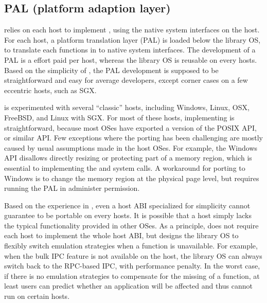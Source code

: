 \subsection{PAL (platform adaption layer)}
\label{sec:overview:host:pal}


\graphene{} relies on each host to implement \thehostabi{}, using the native system interfaces on the host.
For each host, a platform translation layer (PAL)
is loaded below the library OS, to translate each functions in \thehostabi{} to native system interfaces.
The development of a PAL is a effort paid per host, whereas the library OS is reusable on every hosts. %
Based on the simplicity of \thehostabi{}, the PAL development is supposed to be straightforward and easy for average developers, except corner cases on a few eccentric hosts, such as SGX.




\graphene{} is experimented with
several ``classic'' hosts, including Windows, Linux, OSX, FreeBSD, and Linux with SGX.
For most of these hosts,
implementing \thehostabi{} is straightforward,
because most OSes have exported a version of the POSIX API, or similar API.
Few exceptions where the porting has been challenging
are mostly caused by usual assumptions made in the host OSes.
For example, the Windows API disallows directly resizing or protecting part of a memory region, which is essential to implementing the  and  system calls.
A workaround for porting \thehostabi{} to Windows is to change the memory region
at the physical page level,
but requires running the PAL in administer permission.




Based on the experience in \graphene{},
even a host ABI specialized for simplicity cannot guarantee to be portable on every hosts.
It is possible that a host simply lacks the typical functionality
provided in other OSes.
As a principle, \graphene{} does not require each host to implement the whole host ABI,
but designs the library OS to flexibly switch emulation strategies
when a function is unavailable.
For example, when the bulk IPC feature is not available on the host,
the library OS can always switch back to the RPC-based IPC, with performance penalty.
In the worst case, if there is no emulation strategies
to compensate for the missing of a function,
at least users can predict whether an application will be affected and thus cannot run on certain hosts.



